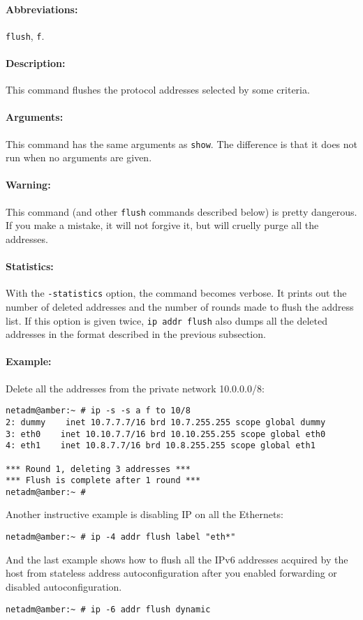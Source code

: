 \paragraph{Abbreviations:} \verb|flush|, \verb|f|.

\paragraph{Description:}This command flushes the protocol addresses
selected by some criteria.

\paragraph{Arguments:} This command has the same arguments as \verb|show|.
The difference is that it does not run when no arguments are given.

\paragraph{Warning:} This command (and other \verb|flush| commands
described below) is pretty dangerous. If you make a mistake, it will
not forgive it, but will cruelly purge all the addresses.

\paragraph{Statistics:} With the \verb|-statistics| option, the command
becomes verbose. It prints out the number of deleted addresses and the number
of rounds made to flush the address list. If this option is given
twice, \verb|ip addr flush| also dumps all the deleted addresses
in the format described in the previous subsection.

\paragraph{Example:} Delete all the addresses from the private network
10.0.0.0/8:
\begin{verbatim}
netadm@amber:~ # ip -s -s a f to 10/8
2: dummy    inet 10.7.7.7/16 brd 10.7.255.255 scope global dummy
3: eth0    inet 10.10.7.7/16 brd 10.10.255.255 scope global eth0
4: eth1    inet 10.8.7.7/16 brd 10.8.255.255 scope global eth1

*** Round 1, deleting 3 addresses ***
*** Flush is complete after 1 round ***
netadm@amber:~ # 
\end{verbatim}
Another instructive example is disabling IP on all the Ethernets:
\begin{verbatim}
netadm@amber:~ # ip -4 addr flush label "eth*"
\end{verbatim}
And the last example shows how to flush all the IPv6 addresses
acquired by the host from stateless address autoconfiguration
after you enabled forwarding or disabled autoconfiguration.
\begin{verbatim}
netadm@amber:~ # ip -6 addr flush dynamic
\end{verbatim}



